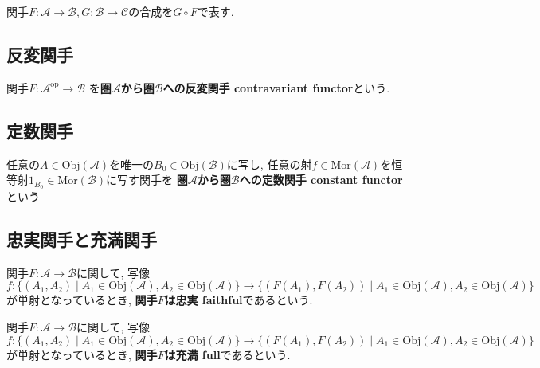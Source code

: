 \begin{Notation}
関手$F:\mathscr{A}\rightarrow\mathscr{B},G:\mathscr{B}\rightarrow\mathscr{C}$の合成を$G\circ F$で表す.
\end{Notation}
\begin{comment}
\begin{example}
順序を保存する写像
\end{example}
\end{comment}
\begin{comment}
\begin{example}
圏と見做した順序集合間の簡単な関手の例
\end{example}
\end{comment}
\begin{comment}
*************************
\begin{example}
$n$次ホモロジー関手
\end{example}
***************************
\end{comment}

\subsection{反変関手}
\begin{Def}
関手$F:\mathscr{A}^{\mathrm{op}}\rightarrow\mathscr{B}$
を{\bf 圏$\mathscr{A}$から圏$\mathscr{B}$への反変関手 contravariant functor}という.
\end{Def}
\subsection{定数関手}
\begin{Def}
任意の$A\in\mathrm{Obj}(\mathscr{A})$を唯一の$B_0\in\mathrm{Obj}(\mathscr{B})$に写し,
任意の射$f\in\mathrm{Mor}(\mathscr{A})$を恒等射$1_{B_0}\in\mathrm{Mor}(\mathscr{B})$に写す関手を
{\bf 圏$\mathscr{A}$から圏$\mathscr{B}$への定数関手 constant functor}という
\end{Def}

\subsection{忠実関手と充満関手}
\begin{Def}
関手$F:\mathscr{A}\rightarrow\mathscr{B}$に関して,
写像
\[f:\{(A_1,A_2)\mid A_1\in\mathrm{Obj}(\mathscr{A}),A_2\in\mathrm{Obj}(\mathscr{A})\}\rightarrow\{(F(A_1),F(A_2))\mid A_1\in\mathrm{Obj}(\mathscr{A}),A_2\in\mathrm{Obj}(\mathscr{A})\}\]
が単射となっているとき,
{\bf 関手$F$は忠実 faithful}であるという.
\end{Def}
\begin{Def}
関手$F:\mathscr{A}\rightarrow\mathscr{B}$に関して,
写像
\[f:\{(A_1,A_2)\mid A_1\in\mathrm{Obj}(\mathscr{A}),A_2\in\mathrm{Obj}(\mathscr{A})\}\rightarrow\{(F(A_1),F(A_2))\mid A_1\in\mathrm{Obj}(\mathscr{A}),A_2\in\mathrm{Obj}(\mathscr{A})\}\]
が単射となっているとき,
{\bf 関手$F$は充満 full}であるという.
\end{Def}

